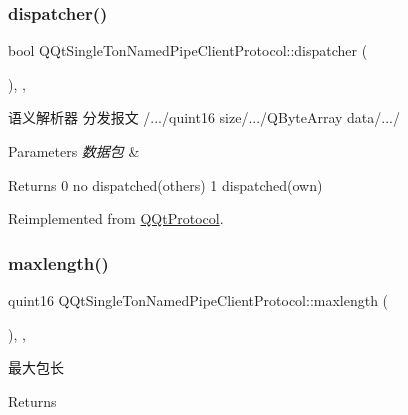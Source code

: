 \subsubsection{\texorpdfstring{dispatcher()}{dispatcher()}}
{\footnotesize\ttfamily bool Q\+Qt\+Single\+Ton\+Named\+Pipe\+Client\+Protocol\+::dispatcher (\begin{DoxyParamCaption}\item[{const Q\+Byte\+Array \&}]{ }\end{DoxyParamCaption})\hspace{0.3cm}{\ttfamily [override]}, {\ttfamily [protected]}, {\ttfamily [virtual]}}



语义解析器 分发报文 /.../quint16 size/.../\+Q\+Byte\+Array data/.../ 


\begin{DoxyParams}{Parameters}
{\em 数据包} & \\
\hline
\end{DoxyParams}
\begin{DoxyReturn}{Returns}
0 no dispatched(others) 1 dispatched(own) 
\end{DoxyReturn}


Reimplemented from \mbox{\hyperlink{class_q_qt_protocol_a35a69c4b89c8cf7459038f40d75e0dc9}{Q\+Qt\+Protocol}}.

\mbox{\label{class_q_qt_single_ton_named_pipe_client_protocol_a22f3540009470dac721de651e9b48adb}} 
\subsubsection{\texorpdfstring{maxlength()}{maxlength()}}
{\footnotesize\ttfamily quint16 Q\+Qt\+Single\+Ton\+Named\+Pipe\+Client\+Protocol\+::maxlength (\begin{DoxyParamCaption}{ }\end{DoxyParamCaption})\hspace{0.3cm}{\ttfamily [override]}, {\ttfamily [protected]}, {\ttfamily [virtual]}}



最大包长 

\begin{DoxyReturn}{Returns}

\end{DoxyReturn}


